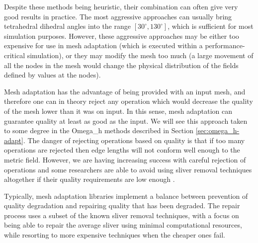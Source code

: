 Despite these methods being heuristic, their combination can often
give very good results in practice.
The most aggressive approaches
\cite{klingner2008aggressive,dassi2016tetrahedral}
can usually bring tetrahedral dihedral angles into
the range $[30^\circ,130^\circ]$, which is sufficient for
most simulation purposes.
However, these aggressive approaches may be either too expensive
for use in mesh adaptation (which is executed within a
performance-critical simulation), or they may modify the mesh
too much (a large movement of all the nodes in the mesh would
change the physical distribution of the fields defined by values
at the nodes).

Mesh adaptation has the advantage of being provided with an input
mesh, and therefore one can in theory reject any operation which
would decrease the quality of the mesh lower than it was on input.
In this sense, mesh adaptation can guarantee quality at least as good
as the input.
We will see this approach taken to some degree in the Omega\_h methods
described in Section \ref{sec:omega_h-adapt}.
The danger of rejecting operations based on quality is that
if too many operations are rejected then edge lengths will
not conform well enough to the metric field.
However, we are having increasing success with
careful rejection of operations and some researchers
are able to avoid using sliver removal techniques
altogether if their quality requirements are low
enough \cite{michal2012anisotropic,loseille20093d}.

Typically, mesh adaptation libraries implement a balance
between prevention of quality degradation and repairing
quality that has been degraded.
The repair process uses a subset of the known sliver removal
techniques, with a focus on being able to repair the average
sliver using minimal computational resources, while resorting
to more expensive techniques when the cheaper ones fail.


